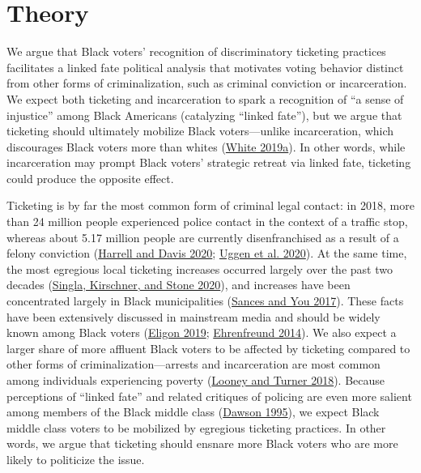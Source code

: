 \documentclass[
  12pt,
]{article}
\begin{document}
\hypertarget{theory}{%
\section*{Theory}\label{theory}}

We argue that Black voters' recognition of discriminatory ticketing practices facilitates a linked fate political analysis that motivates voting behavior distinct from other forms of criminalization, such as criminal conviction or incarceration. We expect both ticketing and incarceration to spark a recognition of ``a sense of injustice'' among Black Americans (catalyzing ``linked fate''), but we argue that ticketing should ultimately mobilize Black voters---unlike incarceration, which discourages Black voters more than whites (\protect\hyperlink{ref-White2019}{White 2019a}). In other words, while incarceration may prompt Black voters' strategic retreat via linked fate, ticketing could produce the opposite effect.

Ticketing is by far the most common form of criminal legal contact: in 2018, more than 24 million people experienced police contact in the context of a traffic stop, whereas about 5.17 million people are currently disenfranchised as a result of a felony conviction (\protect\hyperlink{ref-Harrell2020}{Harrell and Davis 2020}; \protect\hyperlink{ref-Uggen2020}{Uggen et al. 2020}). At the same time, the most egregious local ticketing increases occurred largely over the past two decades (\protect\hyperlink{ref-Singla2020}{Singla, Kirschner, and Stone 2020}), and increases have been concentrated largely in Black municipalities (\protect\hyperlink{ref-Sances2017}{Sances and You 2017}). These facts have been extensively discussed in mainstream media and should be widely known among Black voters (\protect\hyperlink{ref-Eligon2019}{Eligon 2019}; \protect\hyperlink{ref-Ehrenfreund2014}{Ehrenfreund 2014}). We also expect a larger share of more affluent Black voters to be affected by ticketing compared to other forms of criminalization---arrests and incarceration are most common among individuals experiencing poverty (\protect\hyperlink{ref-Looney2018}{Looney and Turner 2018}). Because perceptions of ``linked fate'' and related critiques of policing are even more salient among members of the Black middle class (\protect\hyperlink{ref-Dawson1995}{Dawson 1995}), we expect Black middle class voters to be mobilized by egregious ticketing practices. In other words, we argue that ticketing should ensnare more Black voters who are more likely to politicize the issue.
\end{document}
